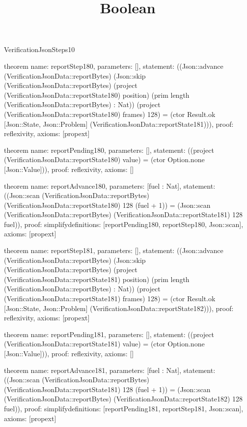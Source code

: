 \begin{lexlean}{VerificationJsonSteps10}
\title{Boolean}
\begin{semanticmodule}

theorem{
  name: reportStep180,
  parameters: [],
  statement: ((Json::advance (VerificationJsonData::reportBytes) (Json::skip (VerificationJsonData::reportBytes) (project (VerificationJsonData::reportState180) position) (prim length (VerificationJsonData::reportBytes) : Nat)) (project (VerificationJsonData::reportState180) frames) 128) = (ctor Result.ok [Json::State, Json::Problem] (VerificationJsonData::reportState181))),
  proof: reflexivity{},
  axioms: [propext]
}

theorem{
  name: reportPending180,
  parameters: [],
  statement: ((project (VerificationJsonData::reportState180) value) = (ctor Option.none [Json::Value])),
  proof: reflexivity{},
  axioms: []
}

theorem{
  name: reportAdvance180,
  parameters: [fuel : Nat],
  statement: ((Json::scan (VerificationJsonData::reportBytes) (VerificationJsonData::reportState180) 128 (fuel + 1)) = (Json::scan (VerificationJsonData::reportBytes) (VerificationJsonData::reportState181) 128 fuel)),
  proof: simplify{definitions: [reportPending180, reportStep180, Json::scan]},
  axioms: [propext]
}

theorem{
  name: reportStep181,
  parameters: [],
  statement: ((Json::advance (VerificationJsonData::reportBytes) (Json::skip (VerificationJsonData::reportBytes) (project (VerificationJsonData::reportState181) position) (prim length (VerificationJsonData::reportBytes) : Nat)) (project (VerificationJsonData::reportState181) frames) 128) = (ctor Result.ok [Json::State, Json::Problem] (VerificationJsonData::reportState182))),
  proof: reflexivity{},
  axioms: [propext]
}

theorem{
  name: reportPending181,
  parameters: [],
  statement: ((project (VerificationJsonData::reportState181) value) = (ctor Option.none [Json::Value])),
  proof: reflexivity{},
  axioms: []
}

theorem{
  name: reportAdvance181,
  parameters: [fuel : Nat],
  statement: ((Json::scan (VerificationJsonData::reportBytes) (VerificationJsonData::reportState181) 128 (fuel + 1)) = (Json::scan (VerificationJsonData::reportBytes) (VerificationJsonData::reportState182) 128 fuel)),
  proof: simplify{definitions: [reportPending181, reportStep181, Json::scan]},
  axioms: [propext]
}


\end{semanticmodule}
\end{lexlean}

